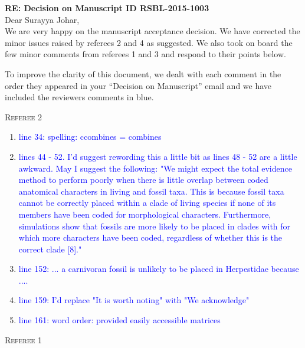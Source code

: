 \documentclass[12pt,letterpaper]{article}
\renewcommand{\section}[1]{%
\bigskip
\begin{center}
\begin{Large}
\normalfont\scshape #1
\medskip
\end{Large}
\end{center}}
\begin{document}
\textbf{RE: Decision on Manuscript ID RSBL-2015-1003}\\
\bigskip
Dear Surayya Johar,\\
\bigskip
We are very happy on the manuscript acceptance decision.
We have corrected the minor issues raised by referees 2 and 4 as suggested.
We also took on board the few minor comments from referees 1 and 3 and respond to their points below.

To improve the clarity of this document, we dealt with each comment in the order they appeared in your ``Decision on Manuscript'' email and we have included the reviewers comments in blue.



\section{Referee 2}

\begin{enumerate}
\item{\textcolor{blue}{line 34: spelling: ccombines = combines}}

\item{\textcolor{blue}{lines 44 - 52. I'd suggest rewording this a little bit as lines 48 - 52 are a little awkward. May I suggest the following:
"We might expect the total evidence method to perform poorly when there is little overlap between coded anatomical characters in living and fossil taxa. This is because fossil taxa cannot be correctly placed within a clade of living species if none of its members have been coded for morphological characters. Furthermore, simulations show that fossils are more likely to be placed in clades with for which more characters have been coded, regardless of whether this is the correct clade [8]."}}

\item{\textcolor{blue}{line 152: ... a carnivoran fossil is unlikely to be placed in Herpestidae because ....}}

\item{\textcolor{blue}{line 159: I'd replace "It is worth noting" with "We acknowledge"}}

\item{\textcolor{blue}{line 161: word order: provided easily accessible matrices}}
\end{enumerate}

\section{Referee 1}
\end{document}
